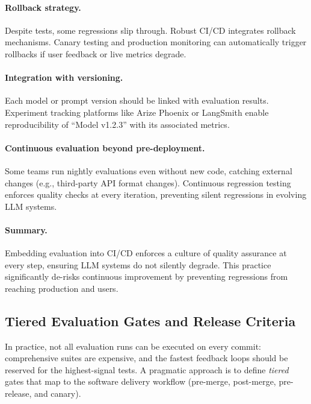 \paragraph*{Rollback strategy.}  
Despite tests, some regressions slip through. Robust CI/CD integrates rollback mechanisms. Canary testing and production monitoring can automatically trigger rollbacks if user feedback or live metrics degrade.

\paragraph*{Integration with versioning.}  
Each model or prompt version should be linked with evaluation results. Experiment tracking platforms like Arize Phoenix or LangSmith enable reproducibility of “Model v1.2.3” with its associated metrics.

\paragraph*{Continuous evaluation beyond pre-deployment.}  
Some teams run nightly evaluations even without new code, catching external changes (e.g., third-party API format changes). Continuous regression testing enforces quality checks at every iteration, preventing silent regressions in evolving LLM systems.

\paragraph*{Summary.}  
Embedding evaluation into CI/CD enforces a culture of quality assurance at every step, ensuring LLM systems do not silently degrade. This practice significantly de-risks continuous improvement by preventing regressions from reaching production and users.


\subsection{Tiered Evaluation Gates and Release Criteria}
\label{sec:ch10-tiered-gates}
In practice, not all evaluation runs can be executed on every commit: comprehensive suites are expensive, and the fastest feedback loops should be reserved for the highest-signal tests. A pragmatic approach is to define \emph{tiered} gates that map to the software delivery workflow (pre-merge, post-merge, pre-release, and canary).

